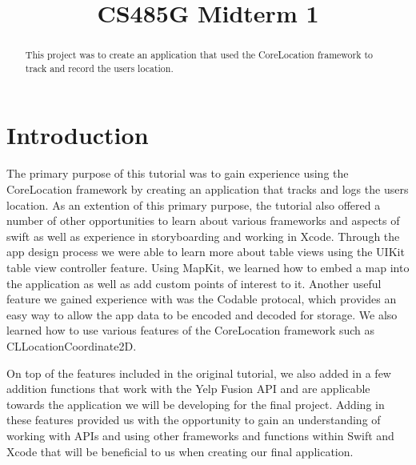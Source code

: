 \documentclass[conference]{IEEEtran}
\begin{document}
\title{CS485G Midterm 1}

\author{
\and
{}
\and
{}
}

\maketitle

\begin{abstract}
This project was to create an application that used the CoreLocation framework to track
and record the users location.
\end{abstract}

\section{Introduction}
The primary purpose of this tutorial was to gain experience using the CoreLocation
framework by creating an application that tracks and logs the users location. As an
extention of this primary purpose, the tutorial also offered a number of other opportunities
to learn about various frameworks and aspects of swift as well as experience in storyboarding
and working in Xcode. Through the app design process we were able to learn more about
table views using the UIKit table view controller feature. Using MapKit, we 
learned how to embed a map into the application as well as add custom points of 
interest to it. Another useful feature we gained experience with was the Codable
protocal, which provides an easy way to allow the app data to be encoded and decoded
for storage. We also learned how to use various features of the CoreLocation 
framework such as CLLocationCoordinate2D.

On top of the features included in the original tutorial, we also added in a few 
addition functions that work with the Yelp Fusion API and are applicable towards 
the application we will be developing for the final project. Adding in these features
provided us with the opportunity to gain an understanding of working with APIs and
using other frameworks and functions within Swift and Xcode that will be beneficial
to us when creating our final application.
\end{document}
